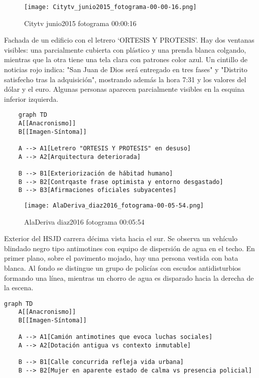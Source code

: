 \clearpage
\begin{figure}[h!]
    \centering
    \texttt{[image: Citytv\_junio2015\_fotograma-00-00-16.png]}
    \caption{Citytv junio2015 fotograma 00:00:16}
    \label{fig:Citytv_junio2015_fotograma_00_00_16}
\end{figure}

Fachada de un edificio con el letrero `ORTESIS Y PROTESIS'. Hay dos ventanas visibles: una parcialmente cubierta con plástico y una prenda blanca colgando, mientras que la otra tiene una tela clara con patrones color azul. Un cintillo de noticias rojo indica: "San Juan de Dios será entregado en tres fases" y "Distrito satisfecho tras la adquisición", mostrando además la hora 7:31 y los valores del dólar y el euro. Algunas personas aparecen parcialmente visibles en la esquina inferior izquierda. \parencite[fotograma: 00:00:16]{Citytv_junio2015}

\small
\begin{verbatim}
    graph TD
    A[[Anacronismo]]
    B[[Imagen-Síntoma]]
    
    A --> A1[Letrero "ORTESIS Y PROTESIS" en desuso]
    A --> A2[Arquitectura deteriorada]
    
    B --> B1[Exteriorización de hábitad humano]
    B --> B2[Contrqaste frase optimista y entorno desgastado]
    B --> B3[Afirmaciones oficiales subyacentes]
\end{verbatim}
\normalsize

\clearpage
\begin{figure}[h!]
    \centering
    \texttt{[image: AlaDeriva\_diaz2016\_fotograma-00-05-54.png]}
    \caption{AlaDeriva diaz2016 fotograma 00:05:54}
    \label{fig:AlaDeriva_diaz2016_fotograma_00_05_54}
\end{figure}

Exterior del HSJD carrera décima vista hacia el sur. Se observa un vehículo blindado negro tipo antimotines con equipo de dispersión de agua en el techo. En primer plano, sobre el pavimento mojado, hay una persona vestida con bata blanca. Al fondo se distingue un grupo de policías con escudos antidisturbios formando una línea, mientras un chorro de agua es disparado hacia la derecha de la escena. \parencite[fotograma: 00:05:54]{AlaDeriva_diaz2016}

\small
\begin{verbatim}
graph TD
    A[[Anacronismo]]
    B[[Imagen-Síntoma]]
    
    A --> A1[Camión antimotines que evoca luchas sociales]
    A --> A2[Dotación antigua vs contexto inmutable]
    
    B --> B1[Calle concurrida refleja vida urbana]
    B --> B2[Mujer en aparente estado de calma vs presencia policial]
\end{verbatim}
\normalsize

